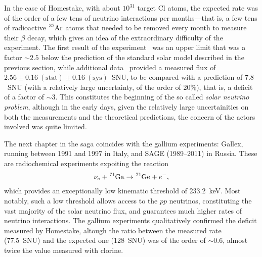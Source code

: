 In the case of Homestake, with about $10^{31}$ target Cl atoms, the expected rate
was of the order of a few tens of neutrino interactions per months---that is, a
few tens of radioactive $\ce{^37Ar}$ atoms that needed to be removed every month
to measure their $\beta$ decay, which gives an idea of the extraordinary difficulty
of the experiment. The first result of the experiment~\cite{1968PhRvL..20.1205D}
was an upper limit that was a factor $\sim 2.5$ below the prediction of the standard
solar model described in the previous section, while additional data~\cite{1998ApJ...496..505C}
provided a measured flux of $2.56 \pm 0.16~(\text{stat}) \pm 0.16~(\text{sys})$~SNU, to be compared with a prediction of $7.8$~SNU (with
a relatively large uncertainty, of the order of 20\%), that is, a deficit of a factor
of $\sim 3$. This constitutes the beginning of the
so called \emph{solar neutrino problem}, although in the early days, given the relatively
large uncertainities on both the measurements and the theoretical predictions, the
concern of the actors involved was quite limited.

The next chapter in the saga coincides with the gallium experiments: Gallex, running
between 1991 and 1997 in Italy, and SAGE (1989--2011) in Russia. These are radiochemical
experiments expoiting the reaction
\begin{align*}
  \nu_e + \ce{^71Ga} \rightarrow \ce{^71Ge} + e^-,
\end{align*}
which provides an exceptionally low kinematic threshold of 233.2~keV. Most notably,
such a low threshold allows access to the $pp$ neutrinos, constituting the vast
majority of the solar neutrino flux, and guarantees much higher rates of neutrino
interactions. The gallium experiments qualitatively confirmed the deficit measured
by Homestake, altough the ratio between the measured rate (77.5~SNU) and the
expected one (128~SNU) was of the order of $\sim 0.6$, almost twice the value measured
with clorine\cite{1999PhLB..447..127H}.

